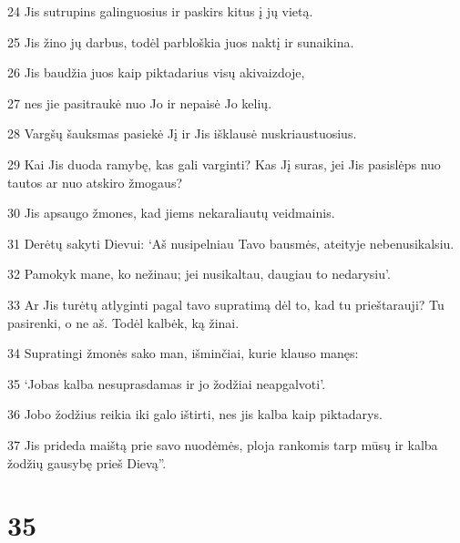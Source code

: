 \par 24 Jis sutrupins galinguosius ir paskirs kitus į jų vietą. 
\par 25 Jis žino jų darbus, todėl parbloškia juos naktį ir sunaikina. 
\par 26 Jis baudžia juos kaip piktadarius visų akivaizdoje, 
\par 27 nes jie pasitraukė nuo Jo ir nepaisė Jo kelių. 
\par 28 Vargšų šauksmas pasiekė Jį ir Jis išklausė nuskriaustuosius. 
\par 29 Kai Jis duoda ramybę, kas gali varginti? Kas Jį suras, jei Jis pasislėps nuo tautos ar nuo atskiro žmogaus? 
\par 30 Jis apsaugo žmones, kad jiems nekaraliautų veidmainis. 
\par 31 Derėtų sakyti Dievui: ‘Aš nusipelniau Tavo bausmės, ateityje nebenusikalsiu. 
\par 32 Pamokyk mane, ko nežinau; jei nusikaltau, daugiau to nedarysiu’. 
\par 33 Ar Jis turėtų atlyginti pagal tavo supratimą dėl to, kad tu prieštarauji? Tu pasirenki, o ne aš. Todėl kalbėk, ką žinai. 
\par 34 Supratingi žmonės sako man, išminčiai, kurie klauso manęs: 
\par 35 ‘Jobas kalba nesuprasdamas ir jo žodžiai neapgalvoti’. 
\par 36 Jobo žodžius reikia iki galo ištirti, nes jis kalba kaip piktadarys. 
\par 37 Jis prideda maištą prie savo nuodėmės, ploja rankomis tarp mūsų ir kalba žodžių gausybę prieš Dievą”.



\chapter{35}


